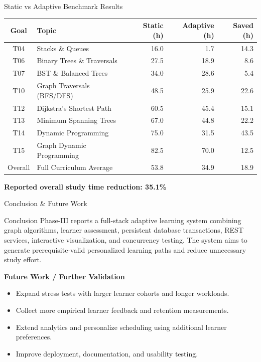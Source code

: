 \documentclass[aspectratio=169,11pt]{beamer}
\begin{document}
\begin{frame}{Static vs Adaptive Benchmark Results}
\scriptsize
\begin{center}
\renewcommand{\arraystretch}{1.15}
\begin{tabularx}{.97\textwidth}{@{}cXrrr@{}}
\toprule
Goal & Topic & Static (h) & Adaptive (h) & Saved (h)\\
\midrule
T04 & Stacks \& Queues & 16.0 & 1.7 & 14.3\\
T06 & Binary Trees \& Traversals & 27.5 & 18.9 & 8.6\\
T07 & BST \& Balanced Trees & 34.0 & 28.6 & 5.4\\
T10 & Graph Traversals (BFS/DFS) & 48.5 & 25.9 & 22.6\\
T12 & Dijkstra's Shortest Path & 60.5 & 45.4 & 15.1\\
T13 & Minimum Spanning Trees & 67.0 & 44.8 & 22.2\\
T14 & Dynamic Programming & 75.0 & 31.5 & 43.5\\
T15 & Graph Dynamic Programming & 82.5 & 70.0 & 12.5\\
\midrule
Overall & Full Curriculum Average & 53.8 & 34.9 & 18.9\\
\bottomrule
\end{tabularx}
\end{center}
\vspace{2mm}
\begin{center}\colorbox{GEULightBlue}{\parbox{.8\textwidth}{\centering\textbf{Reported overall study time reduction: 35.1\%}}}\end{center}
\end{frame}

\begin{frame}{Conclusion \& Future Work}
\begin{block}{Conclusion}
Phase-III reports a full-stack adaptive learning system combining graph algorithms, learner assessment, persistent database transactions, REST services, interactive visualization, and concurrency testing. The system aims to generate prerequisite-valid personalized learning paths and reduce unnecessary study effort.
\end{block}
\textbf{Future Work / Further Validation}
\begin{itemize}\itemsep3pt
\item Expand stress tests with larger learner cohorts and longer workloads.
\item Collect more empirical learner feedback and retention measurements.
\item Extend analytics and personalize scheduling using additional learner preferences.
\item Improve deployment, documentation, and usability testing.
\end{itemize}
\end{frame}
\end{document}
